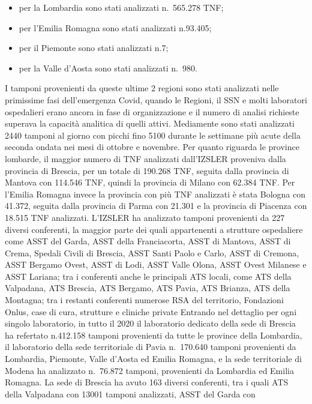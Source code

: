 \documentclass[
  12pt,
]{article}
\providecommand{\tightlist}{%
  \setlength{\itemsep}{0pt}\setlength{\parskip}{0pt}}
\begin{document}
\begin{itemize}
\tightlist
\item
  per la Lombardia sono stati analizzati n.~565.278 TNF;
\item
  per l'Emilia Romagna sono stati analizzati n.93.405;
\item
  per il Piemonte sono stati analizzati n.7;
\item
  per la Valle d'Aosta sono stati analizzati n.~980.
\end{itemize}

I tamponi provenienti da queste ultime 2 regioni sono stati analizzati
nelle primissime fasi dell'emergenza Covid, quando le Regioni, il SSN e
molti laboratori ospedalieri erano ancora in fase di organizzazione e il
numero di analisi richieste superava la capacità analitica di quelli
attivi. Mediamente sono stati analizzati 2440 tamponi al giorno con
picchi fino 5100 durante le settimane più acute della seconda ondata nei
mesi di ottobre e novembre. Per quanto riguarda le province lombarde, il
maggior numero di TNF analizzati dall'IZSLER proveniva dalla provincia
di Brescia, per un totale di 190.268 TNF, seguita dalla provincia di
Mantova con 114.546 TNF, quindi la provincia di Milano con 62.384 TNF.
Per l'Emilia Romagna invece la provincia con più TNF analizzati è stata
Bologna con 41.372, seguita dalla provincia di Parma con 21.301 e la
provincia di Piacenza con 18.515 TNF analizzati. L'IZSLER ha analizzato
tamponi provenienti da 227 diversi conferenti, la maggior parte dei
quali appartenenti a strutture ospedaliere come ASST del Garda, ASST
della Franciacorta, ASST di Mantova, ASST di Crema, Spedali Civili di
Brescia, ASST Santi Paolo e Carlo, ASST di Cremona, ASST Bergamo Ovest,
ASST di Lodi, ASST Valle Olona, ASST Ovest Milanese e ASST Lariana; tra
i conferenti anche le principali ATS locali, come ATS della Valpadana,
ATS Brescia, ATS Bergamo, ATS Pavia, ATS Brianza, ATS della Montagna;
tra i restanti conferenti numerose RSA del territorio, Fondazioni Onlus,
case di cura, strutture e cliniche private Entrando nel dettaglio per
ogni singolo laboratorio, in tutto il 2020 il laboratorio dedicato della
sede di Brescia ha refertato n.412.158 tamponi provenienti da tutte le
province della Lombardia, il laboratorio della sede territoriale di
Pavia n.~170.640 tamponi provenienti da Lombardia, Piemonte, Valle
d'Aosta ed Emilia Romagna, e la sede territoriale di Modena ha
analizzato n.~76.872 tamponi, provenienti da Lombardia ed Emilia
Romagna. La sede di Brescia ha avuto 163 diversi conferenti, tra i quali
ATS della Valpadana con 13001 tamponi analizzati, ASST del Garda con
\end{document}
